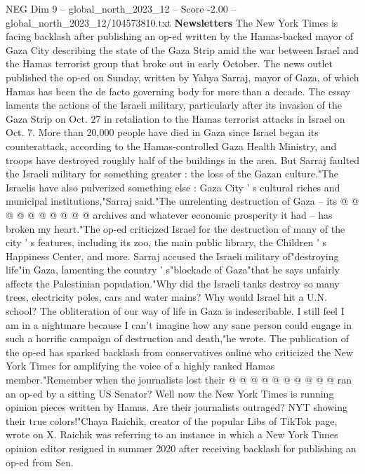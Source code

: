 \begin{textsample}{NEG Dim 9 – global\_north\_2023\_12 – Score -2.00 – global\_north\_2023\_12/104573810.txt}  \label{ex:f9_neg_292}
\textbf{Newsletters} The New York Times is facing backlash after publishing an op-ed written by the Hamas-backed mayor of Gaza City describing the state of the Gaza Strip amid the war between Israel and the Hamas terrorist group that broke out in early October.
The news outlet published the op-ed on Sunday, written by Yahya Sarraj, mayor of Gaza, of which Hamas has been the de facto governing body for more than a decade.
The essay laments the actions of the Israeli military, particularly after its invasion of the Gaza Strip on Oct. 27 in retaliation to the Hamas terrorist attacks in Israel on Oct. 7.
More than 20,000 people have died in Gaza since Israel began its counterattack, according to the Hamas-controlled Gaza Health Ministry, and troops have destroyed roughly half of the buildings in the area.
But Sarraj faulted the Israeli military for something greater : the loss of the Gazan culture."The Israelis have also pulverized something else : Gaza City ' s cultural riches and municipal institutions,"Sarraj said."The unrelenting destruction of Gaza -- its @ @ @ @ @ @ @ @ @ @ archives and whatever economic prosperity it had -- has broken my heart."The op-ed criticized Israel for the destruction of many of the city ' s features, including its zoo, the main public library, the Children ' s Happiness Center, and more.
Sarraj accused the Israeli military of"destroying life"in Gaza, lamenting the country ' s"blockade of Gaza"that he says unfairly affects the Palestinian population."Why did the Israeli tanks destroy so many trees, electricity poles, cars and water mains?
Why would Israel hit a U.N. school?
The obliteration of our way of life in Gaza is indescribable.
I still feel I am in a nightmare because I can't imagine how any sane person could engage in such a horrific campaign of destruction and death,"he wrote.
The publication of the op-ed has sparked backlash from conservatives online who criticized the New York Times for amplifying the voice of a highly ranked Hamas member."Remember when the journalists lost their @ @ @ @ @ @ @ @ @ @ ran an op-ed by a sitting US Senator?
Well now the New York Times is running opinion pieces written by Hamas.
Are their journalists outraged?
NYT showing their true colors!"Chaya Raichik, creator of the popular Libs of TikTok page, wrote on X.
Raichik was referring to an instance in which a New York Times opinion editor resigned in summer 2020 after receiving backlash for publishing an op-ed from Sen.

\end{textsample}
